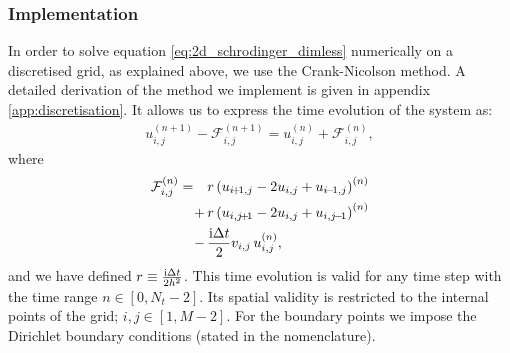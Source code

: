     \subsubsection{Implementation}\label{sec:methods:numerical_scheme:implementation}
        In order to solve equation \eqref{eq:2d_schrodinger_dimless} numerically on a discretised grid, as explained above, we use the Crank-Nicolson method. A detailed derivation of the method we implement is given in appendix \ref{app:discretisation}. It allows us to express the time evolution of the system as:
        \begin{align}\label{eq:equation_to_solve_non-matrix}
            u_{i,j}^{(n+1)} - \mathcal{F}_{i,j}^{(n+1)} = u_{i, j}^{(n)} + \mathcal{F}_{i,j}^{(n)},
        \end{align}
        where
        \begin{equation}
            \begin{split}
            \mathcal{F}_{i,j}^{(n)} = \quad&r\closed{ u_{i\!+\!1, j}-2u_{i,j} + u_{i\!-\!1, j}}^{(n)}  \\
            +\,&  r\closed{u_{i,j\!+\!1}-2u_{i,j} + u_{i,j\!-\!1}}^{(n)}\\ 
            -\,& \frac{\im \Delta t}{2} v_{i,j}\,u_{i,j}^{(n)},
            \end{split}
        \end{equation}
        and we have defined $r\equiv \frac{\mathrm{i}\Delta t}{2h^2}$. This time evolution is valid for any time step with the time range $n\in[0,N_t-2]$. Its spatial validity is restricted to the internal points of the grid; $i,j\in[1,M-2]$. For the boundary points we impose the Dirichlet boundary conditions (stated in the nomenclature). 

